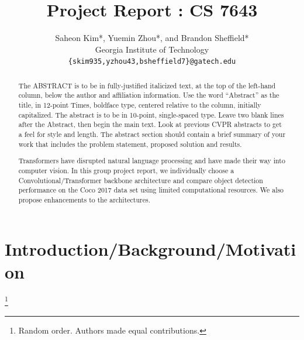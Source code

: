 \documentclass[10pt,twocolumn,letterpaper]{article}
\begin{document}
\title{Project Report : CS 7643}

\author{Saheon Kim*, Yuemin Zhou*, and Brandon Sheffield*\\
Georgia Institute of Technology\\
{\tt\small \{skim935,yzhou43,bsheffield7\}@gatech.edu}
}

\maketitle

\begin{abstract}
   The ABSTRACT is to be in fully-justified italicized text, at the top
   of the left-hand column, below the author and affiliation
   information. Use the word ``Abstract'' as the title, in 12-point
   Times, boldface type, centered relative to the column, initially
   capitalized. The abstract is to be in 10-point, single-spaced type.
   Leave two blank lines after the Abstract, then begin the main text.
   Look at previous CVPR abstracts to get a feel for style and length. 
   The abstract section should contain a brief summary of your work that
   includes the problem statement, proposed solution and results.
   
   Transformers have disrupted natural language processing and have made their way into computer vision. In this group project report, we individually choose a Convolutional/Transformer backbone architecture and compare object detection performance on the Coco 2017 data set using limited computational resources. We also propose enhancements to the architectures.
\end{abstract}

\section{Introduction/Background/Motivation}

\footnote{Random order. Authors made equal contributions.}
\end{document}
